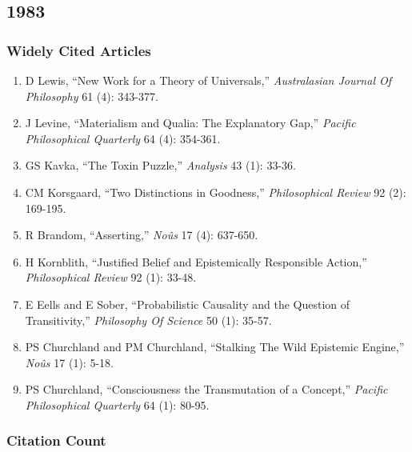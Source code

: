 \documentclass[
  10pt,
  letterpaper,
  DIV=11,
  numbers=noendperiod,
  twoside]{scrartcl}
\providecommand{\tightlist}{%
  \setlength{\itemsep}{0pt}\setlength{\parskip}{0pt}}\usepackage{longtable,booktabs,array}
\begin{document}
\newpage

\subsection{1983}\label{sec-s1983}

\subsubsection*{Widely Cited Articles}\label{widely-cited-articles-7}

\begin{enumerate}
\def\labelenumi{\arabic{enumi}.}
\tightlist
\item
  D Lewis, ``New Work for a Theory of Universals,'' \emph{Australasian
  Journal Of Philosophy} 61 (4): 343-377.
\item
  J Levine, ``Materialism and Qualia: The Explanatory Gap,''
  \emph{Pacific Philosophical Quarterly} 64 (4): 354-361.
\item
  GS Kavka, ``The Toxin Puzzle,'' \emph{Analysis} 43 (1): 33-36.
\item
  CM Korsgaard, ``Two Distinctions in Goodness,'' \emph{Philosophical
  Review} 92 (2): 169-195.
\item
  R Brandom, ``Asserting,'' \emph{Noûs} 17 (4): 637-650.
\item
  H Kornblith, ``Justified Belief and Epistemically Responsible
  Action,'' \emph{Philosophical Review} 92 (1): 33-48.
\item
  E Eells and E Sober, ``Probabilistic Causality and the Question of
  Transitivity,'' \emph{Philosophy Of Science} 50 (1): 35-57.
\item
  PS Churchland and PM Churchland, ``Stalking The Wild Epistemic
  Engine,'' \emph{Noûs} 17 (1): 5-18.
\item
  PS Churchland, ``Consciousness the Transmutation of a Concept,''
  \emph{Pacific Philosophical Quarterly} 64 (1): 80-95.
\end{enumerate}

\subsubsection*{Citation Count}\label{sec-count-1983}
\end{document}
